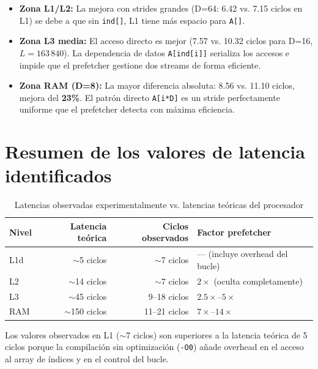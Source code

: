 \documentclass[12pt,a4paper]{article}
\begin{document}
\begin{itemize}[leftmargin=1.5em]
  \item \textbf{Zona L1/L2:} La mejora con strides grandes (D=64: 6.42 vs. 7.15 ciclos en L1) se debe a que sin \texttt{ind[]}, L1 tiene más espacio para \texttt{A[]}.
  \item \textbf{Zona L3 media:} El acceso directo es mejor (7.57 vs. 10.32 ciclos para D=16, $L=163\,840$). La dependencia de datos \texttt{A[ind[i]]} serializa los accesos e impide que el prefetcher gestione dos streams de forma eficiente.
  \item \textbf{Zona RAM (D=8):} La mayor diferencia absoluta: 8.56 vs. 11.10 ciclos, mejora del \textbf{23\%}. El patrón directo \texttt{A[i*D]} es un stride perfectamente uniforme que el prefetcher detecta con máxima eficiencia.
\end{itemize}

\section{Resumen de los valores de latencia identificados}

\begin{table}[H]
\centering
\caption{Latencias observadas experimentalmente vs. latencias teóricas del procesador}
\label{tab:latencias}
\begin{tabular}{lrrl}
\toprule
\textbf{Nivel} & \textbf{Latencia teórica} & \textbf{Ciclos observados} & \textbf{Factor prefetcher} \\
\midrule
L1d  & $\sim$5 ciclos  & $\sim$7 ciclos  & — (incluye overhead del bucle) \\
L2   & $\sim$14 ciclos & $\sim$7 ciclos  & $2\times$ (oculta completamente) \\
L3   & $\sim$45 ciclos & 9--18 ciclos    & $2.5\times$--$5\times$ \\
RAM  & $\sim$150 ciclos & 11--21 ciclos   & $7\times$--$14\times$ \\
\bottomrule
\end{tabular}
\end{table}

Los valores observados en L1 ($\sim$7 ciclos) son superiores a la latencia teórica de 5 ciclos porque la compilación sin optimización (\texttt{-O0}) añade overhead en el acceso al array de índices y en el control del bucle.

\end{document}
